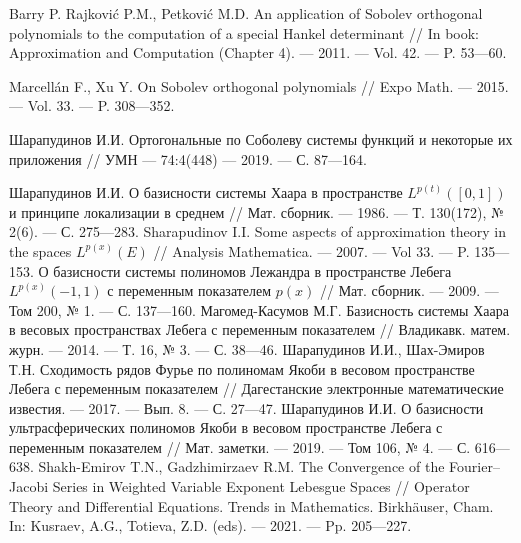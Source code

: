 \begin{thebibliography}{111}

{Barry P. Rajkovi\'c P.M., Petkovi\'c M.D.}
An application of Sobolev orthogonal polynomials to the computation of a special Hankel determinant
//
In book: Approximation and Computation (Chapter 4).
--- 2011.
--- Vol. 42.
--- P. 53---60.

{Marcell\'an F., Xu Y.}
On Sobolev orthogonal polynomials
//
Expo Math.
--- 2015.
--- Vol. 33.
--- P. 308---352.

Шарапудинов И.И.
Ортогональные по Соболеву системы функций и некоторые их приложения
//
УМН
--- 74:4(448)
--- 2019.
--- С. 87---164.

Шарапудинов И.И.
О базисности системы Хаара в пространстве $L^{p(t)}([0,1])$ и принципе локализации в среднем
//
Мат. сборник.
--- 1986.
--- Т. 130(172), № 2(6).
--- С. 275---283.
Sharapudinov I.I. Some aspects of approximation theory in the spaces $L^{p(x)}(E)$
//
Analysis Mathematica.
--- 2007.
--- Vol 33.
--- P. 135---153.
 О базисности системы полиномов Лежандра в пространстве Лебега $L^{p(x)}(-1,1)$ с переменным показателем $p(x)$ // Мат. сборник. --- 2009. --- Том 200, № 1. --- С. 137---160.
Магомед-Касумов М.Г.
Базисность системы Хаара в весовых пространствах Лебега с переменным показателем
//
Владикавк. матем. журн.
--- 2014.
--- Т. 16, № 3.
--- С. 38---46.
Шарапудинов И.И., Шах-Эмиров Т.Н. Сходимость рядов Фурье по полиномам Якоби в весовом пространстве Лебега с переменным показателем // Дагестанские электронные математические известия. --- 2017. --- Вып. 8. --- С. 27---47.
Шарапудинов И.И. О базисности ультрасферических полиномов Якоби в весовом пространстве Лебега с переменным показателем // Мат. заметки. --- 2019. --- Том 106, № 4. --- С. 616---638.
 Shakh-Emirov T.N., Gadzhimirzaev R.M.  The Convergence of the Fourier–Jacobi Series in Weighted Variable Exponent Lebesgue Spaces // Operator Theory and Differential Equations. Trends in Mathematics. Birkhäuser, Cham.  In: Kusraev, A.G., Totieva, Z.D. (eds). --- 2021. --- Pp. 205---227.
    

\end{thebibliography}
